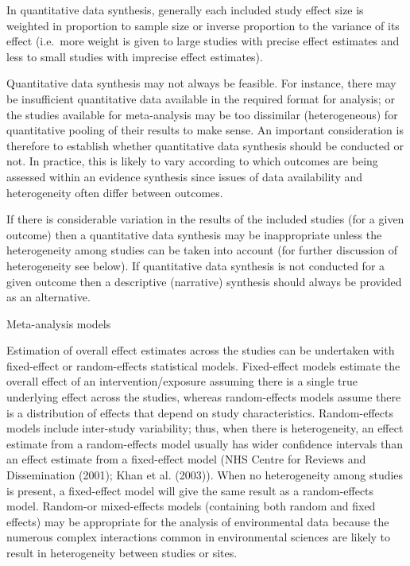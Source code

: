 \documentclass[
  letterpaper,
  DIV=11,
  numbers=noendperiod]{scrreprt}
\begin{document}
In quantitative data synthesis, generally each included study effect
size is weighted in proportion to sample size or inverse proportion to
the variance of its effect (i.e.~more weight is given to large studies
with precise effect estimates and less to small studies with imprecise
effect estimates).

Quantitative data synthesis may not always be feasible. For instance,
there may be insufficient quantitative data available in the required
format for analysis; or the studies available for meta-analysis may be
too dissimilar (heterogeneous) for quantitative pooling of their results
to make sense. An important consideration is therefore to establish
whether quantitative data synthesis should be conducted or not. In
practice, this is likely to vary according to which outcomes are being
assessed within an evidence synthesis since issues of data availability
and heterogeneity often differ between outcomes.

If there is considerable variation in the results of the included
studies (for a given outcome) then a quantitative data synthesis may be
inappropriate unless the heterogeneity among studies can be taken into
account (for further discussion of heterogeneity see below). If
quantitative data synthesis is not conducted for a given outcome then a
descriptive (narrative) synthesis should always be provided as an
alternative.

Meta-analysis models

Estimation of overall effect estimates across the studies can be
undertaken with fixed-effect or random-effects statistical models.
Fixed-effect models estimate the overall effect of an
intervention/exposure assuming there is a single true underlying effect
across the studies, whereas random-effects models assume there is a
distribution of effects that depend on study characteristics.
Random-effects models include inter-study variability; thus, when there
is heterogeneity, an effect estimate from a random-effects model usually
has wider confidence intervals than an effect estimate from a
fixed-effect model (NHS Centre for Reviews and Dissemination (2001);
Khan et al. (2003)). When no heterogeneity among studies is present, a
fixed-effect model will give the same result as a random-effects model.
Random-or mixed-effects models (containing both random and fixed
effects) may be appropriate for the analysis of environmental data
because the numerous complex interactions common in environmental
sciences are likely to result in heterogeneity between studies or sites.
\end{document}
